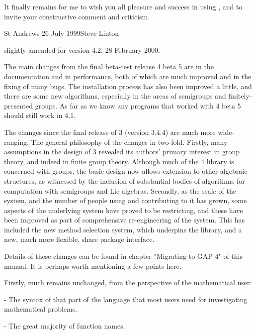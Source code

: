 It finally remains  for me to wish you  all pleasure and success in using
{\GAP}, and to invite your constructive comment and criticism.

St Andrews 26 July 1999\hfill Steve Linton

slightly amended for version 4.2, 28 February  2000.



The main changes from the final beta-test release {\GAP}  4 beta 5 are in
the documentation and in performance, both of which are much improved and
in the   fixing of many  bugs. The  installation  process  has  also been
improved a  little, and there are  some new algorithms, especially in the
areas of semigroups and finitely-presented groups.  As far as we know any
programs that worked with 4 beta 5 should still work in {\GAP} 4.1.

The changes since the final release of  {\GAP} 3 (version 3.4.4) are much
more wide-ranging.   The general philosophy  of  the changes in two-fold.
Firstly, many assumptions in the design of {\GAP} 3 revealed its authors'
primary  interest    in  group  theory,  and  indeed     in  finite group
theory. Although much of the  {\GAP} 4 library  is concerned with groups,
the basic  design now allows extension  to other algebraic structures, as
witnessed  by   the inclusion of   substantial  bodies of  algorithms for
computation with semigroups and Lie  algebras.  Secondly, as the scale of
the  system, and the  number of people  using and contributing  to it has
grown, some   aspects of  the   underlying   system have  proved   to  be
restricting,  and   these have  been  improved as  part  of comprehensive
re-engineering of the system. This has  included the new method selection
system, which underpins the library, and a new, much more flexible, share
package interface.

Details of these changes can be found in chapter "Migrating to GAP 4" of
this manual. It is perhaps worth mentioning a few points here. 

Firstly, much remains unchanged, from the perspective of the mathematical 
user:

\beginlist
  \item{-}
    The syntax of that part  of the {\GAP} language  that most users need
    for investigating mathematical problems.

  \item{-}
    The great majority of function names.

